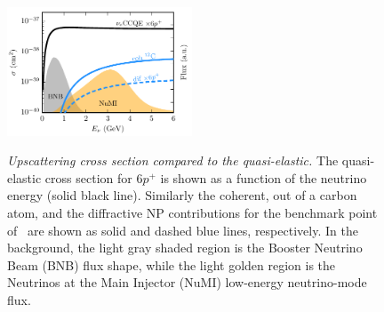 %
\begin{figure}[t!]
    \centering
    \includegraphics[width=0.49\textwidth]{cross_sections.pdf}
    \caption[Upscattering total cross section.]{{\textit{Upscattering cross section compared to the quasi-elastic.}} The quasi-elastic cross section for $6p^+$ is shown as a function of the neutrino energy (solid black line). Similarly the coherent, out of a carbon atom, and the diffractive NP contributions for the benchmark point of~\cite{Bertuzzo:2018itn} are shown as solid and dashed blue lines, respectively. In the background, the light gray shaded region is the Booster Neutrino Beam (BNB) flux shape, while the light golden region is the Neutrinos at the Main Injector (NuMI) low-energy neutrino-mode flux.}{\label{fig:cross_section}}
\end{figure}

